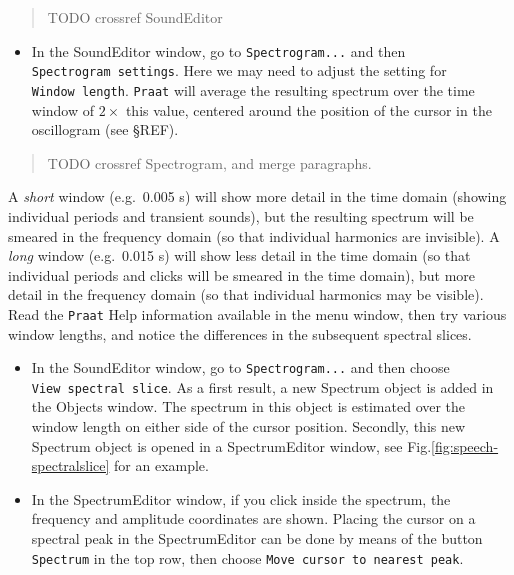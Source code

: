 \documentclass[
]{book}
\providecommand{\tightlist}{%
  \setlength{\itemsep}{0pt}\setlength{\parskip}{0pt}}
\begin{document}
\begin{quote}
TODO crossref SoundEditor
\end{quote}

\begin{itemize}
\tightlist
\item
  In the SoundEditor window, go to \texttt{Spectrogram...} and then \texttt{Spectrogram\ settings}. Here we may need to adjust the setting for \texttt{Window\ length}. \texttt{Praat} will average the resulting spectrum over the time window of \(2\times\) this value, centered around the position of the cursor in the oscillogram (see §REF).
\end{itemize}

\begin{quote}
TODO crossref Spectrogram, and merge paragraphs.
\end{quote}

A \emph{short} window (e.g.~0.005 s) will show more detail in the time domain (showing individual periods and transient sounds), but the resulting spectrum will be smeared in the frequency domain (so that individual harmonics are invisible). A \emph{long} window (e.g.~0.015 s) will show less detail in the time domain (so that individual periods and clicks will be smeared in the time domain), but more detail in the frequency domain (so that individual harmonics may be visible). Read the \texttt{Praat} Help information available in the menu window, then try various window lengths, and notice the differences in the subsequent spectral slices.

\begin{itemize}
\item
  In the SoundEditor window, go to \texttt{Spectrogram...} and then choose \texttt{View\ spectral\ slice}. As a first result, a new Spectrum object is added in the Objects window. The spectrum in this object is estimated over the window length on either side of the cursor position. Secondly, this new Spectrum object is opened in a SpectrumEditor window, see Fig.\ref{fig:speech-spectralslice} for an example.
\item
  In the SpectrumEditor window, if you click inside the spectrum, the frequency and amplitude coordinates are shown. Placing the cursor on a spectral peak in the SpectrumEditor can be done by means of the button \texttt{Spectrum} in the top row, then choose \texttt{Move\ cursor\ to\ nearest\ peak}.
\end{itemize}
\end{document}
